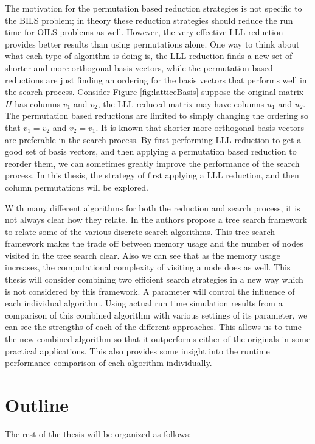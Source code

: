 \documentclass[12pt,Bold,letterpaper]{mcgilletdclass}
\newcommand{\vsp}{\vspace{\baselineskip}}
\begin{document}
The motivation for the permutation based reduction strategies is not specific to the BILS problem; in theory these reduction strategies should reduce the run time for OILS problems as well. However, the very effective LLL reduction provides better results than using permutations alone. One way to think about what each type of algorithm is doing is, the LLL reduction finds a new set of shorter and more orthogonal basis vectors, while the permutation based reductions are just finding an ordering for the basis vectors that performs well in the search process. Consider Figure \ref{fig:latticeBasis} suppose the original matrix $H$ has columns $v_1$ and $v_2$, the LLL reduced matrix may have columns $u_1$ and $u_2$. The permutation based reductions are limited to simply changing the ordering so that $v_1 = v_2$ and $v_2 = v_1$. It is known that shorter more orthogonal basis vectors are preferable in the search process. By first performing LLL reduction to get a good set of basis vectors, and then applying a permutation based reduction to reorder them, we can sometimes greatly improve the performance of the search process. In this thesis, the strategy of first applying a LLL reduction, and then column permutations will be explored.

With many different algorithms for both the reduction and search process, it is not always clear how they relate. In \cite{MurGDC06} the authors propose a tree search framework to relate some of the various discrete search algorithms. This tree search framework makes the trade off between memory usage and the number of nodes visited in the tree search clear. Also we can see that as the memory usage increases, the computational complexity of visiting a node does as well. This thesis will consider combining two efficient search strategies in a new way which is not considered by this framework. A parameter will control the influence of each individual algorithm. Using actual run time simulation results from a comparison of this combined algorithm with various settings of its parameter, we can see the strengths of each of the different approaches. This allows us to tune the new combined algorithm so that it outperforms either of the originals in some practical applications. This also provides some insight into the runtime performance comparison of each algorithm individually.

\vsp \section{Outline}
The rest of the thesis will be organized as follows;
\end{document}
